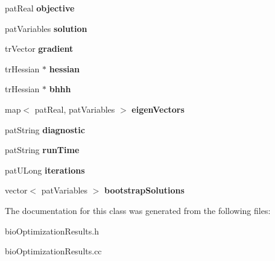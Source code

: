 \begin{DoxyCompactItemize}
\item 
\mbox{\label{classbio_optimization_results_a449d6de9f60625015d0c141a335eda56}} 
pat\+Real {\bfseries objective}
\item 
\mbox{\label{classbio_optimization_results_a417c6164569e3db08e08d23b2aaf53a1}} 
pat\+Variables {\bfseries solution}
\item 
\mbox{\label{classbio_optimization_results_a930fa4c22c86ce8bd79187cd31b3e1f2}} 
tr\+Vector {\bfseries gradient}
\item 
\mbox{\label{classbio_optimization_results_a60ad2269b5ce67824abd1cbf518a502d}} 
tr\+Hessian $\ast$ {\bfseries hessian}
\item 
\mbox{\label{classbio_optimization_results_a9a121434ac67c79b880be9d1f64d45bd}} 
tr\+Hessian $\ast$ {\bfseries bhhh}
\item 
\mbox{\label{classbio_optimization_results_a91a650dc323d336f71f9059a6ac075d0}} 
map$<$ pat\+Real, pat\+Variables $>$ {\bfseries eigen\+Vectors}
\item 
\mbox{\label{classbio_optimization_results_a83e9fcb9cb556d52f7eaaffdb137a5ae}} 
pat\+String {\bfseries diagnostic}
\item 
\mbox{\label{classbio_optimization_results_a5238da4fe6d9de6a24bfe0abca9a9b6e}} 
pat\+String {\bfseries run\+Time}
\item 
\mbox{\label{classbio_optimization_results_af5cdf3d583c5d92bc20768bd911c8949}} 
pat\+U\+Long {\bfseries iterations}
\item 
\mbox{\label{classbio_optimization_results_ad4864b6003b6cbf137869fd04c937a4c}} 
vector$<$ pat\+Variables $>$ {\bfseries bootstrap\+Solutions}
\end{DoxyCompactItemize}


The documentation for this class was generated from the following files\+:\begin{DoxyCompactItemize}
\item 
bio\+Optimization\+Results.\+h\item 
bio\+Optimization\+Results.\+cc\end{DoxyCompactItemize}
